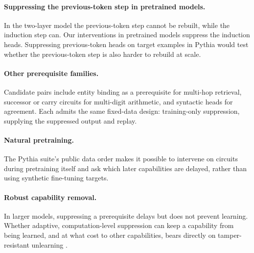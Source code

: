 \paragraph{Suppressing the previous-token step in pretrained models.} In the
two-layer model the previous-token step cannot be rebuilt, while the induction step
can. Our interventions in pretrained models suppress the induction heads.
Suppressing previous-token heads on target examples in Pythia would test whether
the previous-token step is also harder to rebuild at scale.

\paragraph{Other prerequisite families.} Candidate pairs include entity binding as a
prerequisite for multi-hop retrieval, successor or carry circuits for multi-digit
arithmetic, and syntactic heads for agreement. Each admits the same fixed-data
design: training-only suppression, supplying the suppressed output and replay.

\paragraph{Natural pretraining.} The Pythia suite's public data order makes it
possible to intervene on circuits during pretraining itself and ask which later
capabilities are delayed, rather than using synthetic fine-tuning targets.

\paragraph{Robust capability removal.} In larger models, suppressing a prerequisite
delays but does not prevent learning. Whether adaptive, computation-level
suppression can keep a capability from being learned, and at what cost to other
capabilities, bears directly on tamper-resistant unlearning
\citep{tamirisa2025tamper,che2025tampering}.
